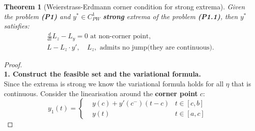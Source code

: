 \documentclass[a4paper,11pt,fleqn]{book}
\newtheorem{theorem}{Theorem}[section]
\theoremstyle{definition}
\theoremstyle{remark}
\begin{document}
\begin{theorem}[Weierstrass-Erdmann corner condition for strong extrema]
	Given the problem \textbf{(P1)} and $y^* \in  C^1_{PW}$ \textbf{strong} extrema of the problem \textbf{(P1.1)}, then $y^*$ satisfies:
	\begin{equation}
	\begin{aligned}
		& \frac{d}{dt} L_z - L_y = 0 \text{ at non-corner point,} \\
		& L - L_z \cdot y',  \quad  L_z,  \text{ admits no jump(they are continuous).}
	\end{aligned}
	\end{equation}
\end{theorem}
\begin{proof}
\quad\\
\textbf{1. Construct the feasible set and the variational formula.}\\
Since the extrema is strong we know the variational formula holds for all $\eta$ that is continuous.  Consider the linearisation around the \textbf{corner point} $c$:
\begin{equation*}
y_1(t)=\left\{
\begin{aligned}
	 & y(c) + y'(c^-)(t - c) &t \in [c, b]\\
	 & y(t) &t \in [a, c]	
\end{aligned}
\right.
\end{equation*}


\end{proof}
\end{document}
